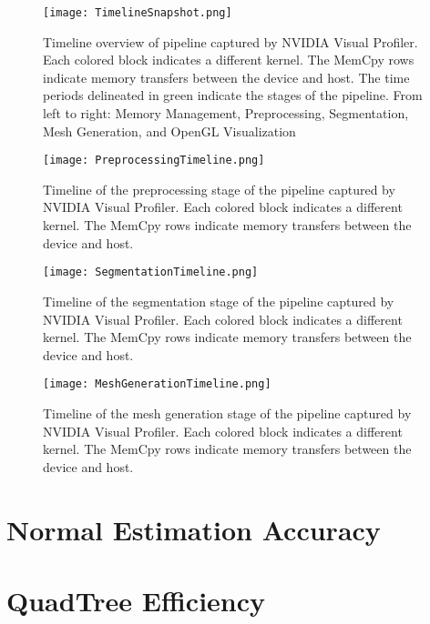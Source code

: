 \begin{figure}[!htpb]
    \centering
    \texttt{[image: TimelineSnapshot.png]}
    \caption{Timeline overview of pipeline captured by NVIDIA Visual Profiler. Each colored block indicates a different kernel. The MemCpy rows indicate memory transfers between the device and host. The time periods delineated in green indicate the stages of the pipeline. From left to right: Memory Management, Preprocessing, Segmentation, Mesh Generation, and OpenGL Visualization}
    \label{fig:fulltimeline}
\end{figure}


\begin{figure}[!htpb]
    \centering
    \texttt{[image: PreprocessingTimeline.png]}
    \caption{Timeline of the preprocessing stage of the pipeline captured by NVIDIA Visual Profiler. Each colored block indicates a different kernel. The MemCpy rows indicate memory transfers between the device and host.}
    \label{fig:preprocessingtimeline}
\end{figure}


\begin{figure}[!htpb]
    \centering
    \texttt{[image: SegmentationTimeline.png]}
    \caption{Timeline of the segmentation stage of the pipeline captured by NVIDIA Visual Profiler. Each colored block indicates a different kernel. The MemCpy rows indicate memory transfers between the device and host.}
    \label{fig:segmentationtimeline}
\end{figure}

\begin{figure}[!htpb]
    \centering
    \texttt{[image: MeshGenerationTimeline.png]}
    \caption{Timeline of the mesh generation stage of the pipeline captured by NVIDIA Visual Profiler. Each colored block indicates a different kernel. The MemCpy rows indicate memory transfers between the device and host.}
    \label{fig:meshgenerationtimeline}
\end{figure}

\section{Normal Estimation Accuracy}

\section{QuadTree Efficiency}
